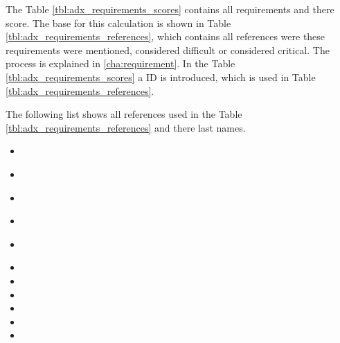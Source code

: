 The Table \ref{tbl:adx_requirements_scores} contains all requirements and there score.
The base for this calculation is shown in Table \ref{tbl:adx_requirements_references}, which contains all references were these requirements were mentioned, considered difficult or considered critical.
The process is explained in \ref{cha:requirement}.
In the Table \ref{tbl:adx_requirements_scores} a \ac{ID} is introduced, which is used in Table \ref{tbl:adx_requirements_references}.

The following list shows all references used in the Table \ref{tbl:adx_requirements_references} and there last names.
\begin{itemize}
    \item \textcite{Dornenburg.2019}
    \item \textcite{Grijzen.2019}
    \item \textcite{Jackson.2019}
    \item \textcite{Laug.2018}
    \item \textcite{Leitner.2020}
    \item \textciteOlleck{}
    \item \textciteJovanovic{}
    \item \textciteMezzalira{}
    \item \textciteSteyer{}
    \item \textciteHuber{}
    \item \textciteRehm{}
\end{itemize}



